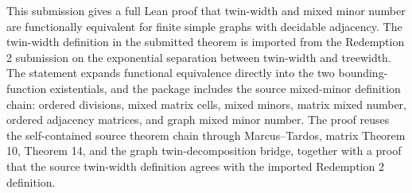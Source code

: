 This submission gives a full Lean proof that twin-width and mixed minor number
are functionally equivalent for finite simple graphs with decidable adjacency.
The twin-width definition in the submitted theorem is imported from the
Redemption 2 submission on the
exponential separation between twin-width and treewidth.  The statement expands
functional equivalence directly into the two bounding-function existentials, and
the package includes the source mixed-minor definition chain: ordered divisions,
mixed matrix cells, mixed minors, matrix mixed number, ordered adjacency
matrices, and graph mixed minor number.
The proof reuses the self-contained source theorem chain through Marcus--Tardos,
matrix Theorem 10, Theorem 14, and the graph twin-decomposition bridge, together
with a proof that the source twin-width definition agrees with the imported
Redemption 2 definition.

